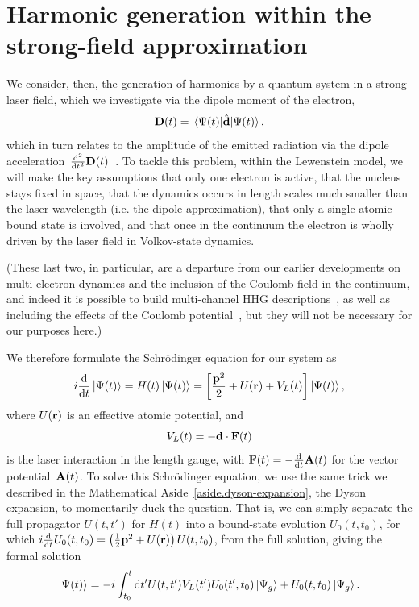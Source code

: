 \section{Harmonic generation within the strong-field approximation}
\label{sec:lewenstein-hhg}
We consider, then, the generation of harmonics by a quantum system in a strong laser field, which we investigate via the dipole moment of the electron,
\begin{equation}
\vbD(t) = \matrixel{\Psi(t)}{\hat{\vbd}}{\Psi(t)},
\end{equation}
which in turn relates to the amplitude of the emitted radiation via the dipole acceleration~$\tfrac{\mathrm{d}^2}{\mathrm{d} t^2} \vb{D}(t)$~\cite{lipson_optical-physics}. To tackle this problem, within the Lewenstein model, we will make the key assumptions that only one electron is active, that the nucleus stays fixed in space, that the dynamics occurs in length scales much smaller than the laser wavelength (i.e. the dipole approximation), that only a single atomic bound state is involved, and that once in the continuum the electron is wholly driven by the laser field in Volkov-state dynamics.

(These last two, in particular, are a departure from our earlier developments on multi-electron dynamics and the inclusion of the Coulomb field in the continuum, and indeed it is possible to build multi-channel HHG descriptions~\cite{ HHGTutorial, smirnova_multielectron-hhg_2009, mairesse_high-harmonic-spectroscopy_2010}, as well as including the effects of the Coulomb potential~\cite{ARM_Coulomb_HHG}, but they will not be necessary for our purposes here.)

We therefore formulate the Schrödinger equation for our system as
\begin{equation}
i\frac{\mathrm{d}}{\mathrm{d} t}\ket{\Psi(t)}
= H(t)\ket{\Psi(t)}
=\left[ \frac{\vb{p}^2}{2} + U(\vb{r}) + V_L(t) \right]\ket{\Psi(t)},
\end{equation}
where $U(\vb{r})$ is an effective atomic potential, and
\begin{equation}
V_L(t) = -\vb{d}\cdot \vb{F}(t)
\end{equation}
is the laser interaction in the length gauge, with $\vb{F}(t)=-\frac{\mathrm{d}}{\mathrm{d} t}\vb{A}(t)$ for the vector potential~$\vb{A}(t)$. To solve this Schrödinger equation, we use the same trick we described in the Mathematical Aside~\ref{aside.dyson-expansion}, the Dyson expansion, to momentarily duck the question. That is, we can simply separate the full propagator $U(t,t')$ for $H(t)$ into a bound-state evolution $U_0(t,t_0)$, for which $i\tfrac{\mathrm{d}}{\mathrm{d} t}U_0(t,t_0)= \left(\tfrac12 \vb{p}^2 + U(\vb{r})\right)U(t,t_0)$, from the full solution, giving the formal solution
\begin{equation}
\ket{\Psi(t)}
=
-i\int_{t_0}^{t} \mathrm{d} t'
U(t,t')
V_L(t')
U_0(t',t_0)\ket{\Psi_g}
+
U_0(t,t_0)\ket{\Psi_g}
.
\label{e7-hhg-dyson-expansion-full}
\end{equation}

